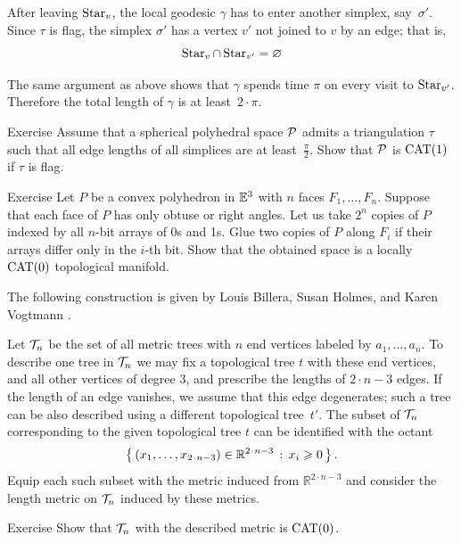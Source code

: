 After leaving $\mathop{\rm Star}\nolimits_v$,
the local geodesic $\gamma$ has to enter another simplex, 
say~$\sigma'$.
Since $\tau$ is flag, the simplex $\sigma'$
has a vertex $v'$ not joined to $v$ by an edge;
that is, 
\[\mathop{\rm Star}\nolimits_v\cap\mathop{\rm Star}\nolimits_{v'}=\varnothing\]

The same argument as above shows that $\gamma$ spends time $\pi$ on every visit to $\mathop{\rm Star}\nolimits_{v'}$.
Therefore the total length of $\gamma$ is at least~$2\cdot\pi$.
\qeds

\begin{thm}{Exercise}\label{ex:flag>=pi/2}
Assume that a spherical polyhedral space $\mathcal{P}$
admits a triangulation $\tau$ such that all edge lengths of all simplices are at least~$\tfrac\pi2$.
Show that $\mathcal{P}$ is $\mathrm{CAT}(1)$
if $\tau$ is flag.
\end{thm}

\begin{thm}{Exercise}\label{ex:polyhedron-glue}
Let $P$ be a convex polyhedron in $\mathbb{E}^3$ with $n$ faces $F_1,\ldots, F_n$.
Suppose that each face of $P$ has only obtuse or right angles.
Let us take $2^n$ copies of $P$ indexed by all $n$-bit arrays of 0s and 1s.
Glue two copies of $P$ along $F_i$ if their arrays differ only in the $i$-th bit.
Show that the obtained space is a locally $\mathrm{CAT}(0)$ topological manifold.
\end{thm}

The following construction is given by
Louis Billera,
Susan Holmes,
and Karen Vogtmann \cite{billera-holmes-vogtmann}.

Let $\mathcal{T}_n$ be the set of all metric trees with 
$n$ end vertices
labeled by $a_1,\ldots,a_n$.
To describe one tree in $\mathcal{T}_n$ we may fix a topological tree $t$ with these end vertices,
and all other vertices of degree 3,
and prescribe the lengths of $2\cdot n-3$ edges.
If the length of an edge vanishes, we assume that this edge degenerates;
such a tree can be also described using a different topological tree~$t'$.
The subset of $\mathcal{T}_n$ corresponding to the given topological tree $t$ can be identified with the octant
\[\set{(x_1,\ldots,x_{2\cdot n-3})\in\mathbb{R}^{2\cdot n-3}}{x_i\ge 0}.\]
Equip each such subset with the metric induced from $\mathbb{R}^{2\cdot n-3}$ and consider the length metric on $\mathcal{T}_n$ induced by these metrics.

\begin{thm}{Exercise}\label{ex:tree}
Show that $\mathcal{T}_n$ with the described metric is $\mathrm{CAT}(0)$.
\end{thm}

